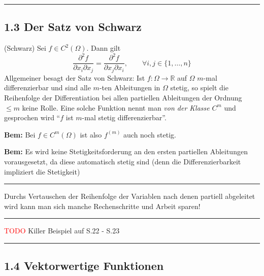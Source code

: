 \documentclass[a4paper,landscape,8pt]{extarticle}
\newcommand{\R}{\mathbb{R}}
\newcommand{\todo}{\textcolor{red}{TODO }}
\newcommand{\sep}{\vspace{5pt}\noindent\hrule\vspace{5pt}}
\newcommand{\Bem}{\textbf{Bem: }}
\begin{document}
\begin{multicols*}{4}
\sep

\subsection{1.3 Der Satz von Schwarz}

\Satz (Schwarz) Sei $f\in C^2(\Omega)$. Dann gilt
\[
\frac{\partial^2 f}{\partial x_i \partial x_j} =
\frac{\partial^2 f}{\partial x_j \partial x_i},
\qquad
\forall i,j \in\{1,\ldots,n\}
\]
Allgemeiner besagt der Satz von Schwarz: Ist $f\colon\Omega\to\R$ auf $\Omega$
$m$-mal differenzierbar und sind alle $m$-ten Ableitungen in $\Omega$ stetig, so
spielt die Reihenfolge der Differentiation bei allen partiellen Ableitungen der
Ordnung $\leq m$ keine Rolle. Eine solche Funktion nennt man \emph{von der
Klasse} $C^m$ und gesprochen wird ``$f$ ist $m$-mal stetig differenzierbar''.

\Bem Bei $f\in C^m(\Omega)$ ist also $f^{(m)}$ auch noch stetig.

\Bem Es wird keine Stetigkeitsforderung an den ersten partiellen Ableitungen
vorausgesetzt, da diese automatisch stetig sind (denn die Differenzierbarkeit
impliziert die Stetigkeit)

\sep

\Trick Durchs Vertauschen der Reihenfolge der Variablen nach denen partiell
abgeleitet wird kann man sich manche Rechenschritte und Arbeit sparen!

\begin{warmup}
\sep

\todo{Killer Beispiel auf S.22 - S.23}

\sep
\end{warmup}

\subsection{1.4 Vektorwertige Funktionen}


\end{multicols*}
\end{document}
